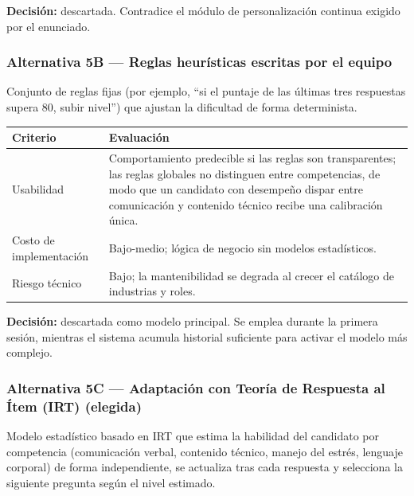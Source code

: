 \noindent\textbf{Decisión:} descartada. Contradice el módulo de
personalización continua exigido por el enunciado.

\subsubsection*{Alternativa 5B — Reglas heurísticas escritas por el equipo}
Conjunto de reglas fijas (por ejemplo, ``si el puntaje de las últimas
tres respuestas supera 80, subir nivel'') que ajustan la dificultad
de forma determinista.

\begin{table}[ht]
\centering\footnotesize
\renewcommand{\arraystretch}{1.2}
\begin{tabularx}{\linewidth}{@{}p{3.6cm} Y@{}}
\toprule
\textbf{Criterio} & \textbf{Evaluación} \\
\midrule
Usabilidad & Comportamiento predecible si las reglas son
transparentes; las reglas globales no distinguen entre competencias,
de modo que un candidato con desempeño dispar entre comunicación y
contenido técnico recibe una calibración única. \\
Costo de implementación & Bajo-medio; lógica de negocio sin modelos
estadísticos. \\
Riesgo técnico & Bajo; la mantenibilidad se degrada al crecer el
catálogo de industrias y roles. \\
\bottomrule
\end{tabularx}
\end{table}

\noindent\textbf{Decisión:} descartada como modelo principal. Se
emplea durante la primera sesión, mientras el sistema acumula
historial suficiente para activar el modelo más complejo.

\subsubsection*{Alternativa 5C — Adaptación con Teoría de Respuesta al Ítem (IRT) (elegida)}
Modelo estadístico basado en IRT que estima la habilidad del candidato
por competencia (comunicación verbal, contenido técnico, manejo del
estrés, lenguaje corporal) de forma independiente, se actualiza tras
cada respuesta y selecciona la siguiente pregunta según el nivel
estimado.


